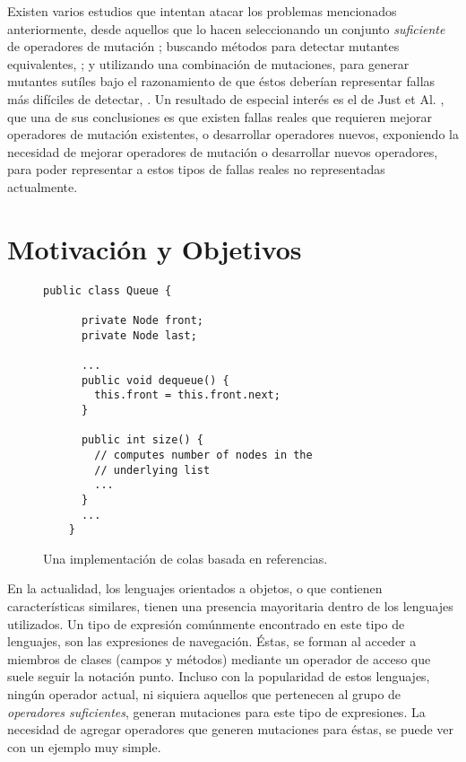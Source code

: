 Existen varios estudios que intentan atacar los problemas mencionados anteriormente, desde aquellos que lo hacen seleccionando un conjunto \emph{suficiente} de operadores de mutaci\'on \cite{bibliography.mutation.selection.Offutt96, bibliography.mutation.selection.ASN2008}; buscando m\'etodos para detectar mutantes equivalentes, \cite{biblography.mutation.evaluation.equivalent.Grun+09, biblography.mutation.evaluation.equivalent.Schuler+10, biblography.mutation.evaluation.equivalent.Just+13}; y utilizando una combinaci\'on de mutaciones, para generar mutantes sut\'iles bajo el razonamiento de que \'estos deber\'ian representar fallas m\'as dif\'iciles de detectar, \cite{bibliography.mutation.highorder.Jia+08, bibliography.mutation.highorder.Jia+09, bibliography.mutation.highorder.Harman+11}. Un resultado de especial inter\'es es el de Just et Al. \cite{bibliography.mutation.evaluation.valid-substitute}, que una de sus conclusiones es que existen fallas reales que requieren mejorar operadores de mutaci\'on existentes, o desarrollar operadores nuevos, exponiendo la necesidad de mejorar operadores de mutaci\'on o desarrollar nuevos operadores, para poder representar a estos tipos de fallas reales no representadas actualmente.

\section{Motivaci\'on y Objetivos}
\label{sec:intro.objetivos}


\begin{figure}[t]
	\begin{lstlisting}[frame=tlrb, mathescape=true]
    public class Queue {
	
      private Node front;
      private Node last;
	
      ...
      public void dequeue() {
        this.front = this.front.next;
      }
	
      public int size() {
        // computes number of nodes in the 
        // underlying list
        ...
      }
      ...
    }
	\end{lstlisting}
	\caption{Una implementaci\'on de colas basada en referencias.}
	\label{figures.motivation.queue-class}
\end{figure}

En la actualidad, los lenguajes orientados a objetos, o que contienen caracter\'isticas similares, tienen una presencia mayoritaria dentro de los lenguajes utilizados. Un tipo de expresi\'on com\'unmente encontrado en este tipo de lenguajes, son las expresiones de navegaci\'on. \'Estas, se forman al acceder a miembros de clases (campos y m\'etodos) mediante un operador de acceso que suele seguir la notaci\'on punto. Incluso con la popularidad de estos lenguajes, ning\'un operador actual, ni siquiera aquellos que pertenecen al grupo de \emph{operadores suficientes}, generan mutaciones para este tipo de expresiones. La necesidad de agregar operadores que generen mutaciones para \'estas, se puede ver con un ejemplo muy simple.

